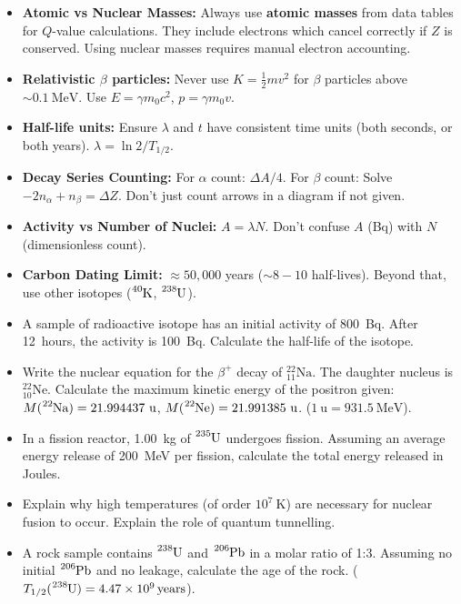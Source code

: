 \documentclass[11pt]{article}
\begin{document}
\begin{attention}
\begin{itemize}
\item \textbf{Atomic vs Nuclear Masses:} Always use \textbf{atomic masses} from data tables for $Q$-value calculations. They include electrons which cancel correctly if $Z$ is conserved. Using nuclear masses requires manual electron accounting.
\item \textbf{Relativistic $\beta$ particles:} Never use $K = \frac{1}{2}mv^2$ for $\beta$ particles above $\sim 0.1\ \text{MeV}$. Use $E = \gamma m_0 c^2$, $p = \gamma m_0 v$.
\item \textbf{Half-life units:} Ensure $\lambda$ and $t$ have consistent time units (both seconds, or both years). $\lambda = \ln 2 / T_{1/2}$.
\item \textbf{Decay Series Counting:} For $\alpha$ count: $\Delta A / 4$. For $\beta$ count: Solve $-2n_\alpha + n_\beta = \Delta Z$. Don't just count arrows in a diagram if not given.
\item \textbf{Activity vs Number of Nuclei:} $A = \lambda N$. Don't confuse $A$ (Bq) with $N$ (dimensionless count).
\item \textbf{Carbon Dating Limit:} $\approx 50,000$ years ($\sim 8-10$ half-lives). Beyond that, use other isotopes ($\ce{^{40}K}$, $\ce{^{238}U}$).
\end{itemize}
\end{attention}

\begin{exercice}
\begin{itemize}
\item A sample of radioactive isotope has an initial activity of \SI{800}{Bq}. After \SI{12}{hours}, the activity is \SI{100}{Bq}. Calculate the half-life of the isotope.
\item Write the nuclear equation for the $\beta^+$ decay of $\ensuremath{\mathrm{^{22}_{11}Na}}$. The daughter nucleus is $\ensuremath{\mathrm{^{22}_{10}Ne}}$. Calculate the maximum kinetic energy of the positron given: $M(\ce{^{22}Na}) = 21.994437\ \text{u}$, $M(\ce{^{22}Ne}) = 21.991385\ \text{u}$. ($1\ \text{u} = 931.5\ \text{MeV}$).
\item In a fission reactor, \SI{1.00}{kg} of $\ce{^{235}U}$ undergoes fission. Assuming an average energy release of \SI{200}{MeV} per fission, calculate the total energy released in Joules.
\item Explain why high temperatures (of order $10^7\ \text{K}$) are necessary for nuclear fusion to occur. Explain the role of quantum tunnelling.
\item A rock sample contains $\ce{^{238}U}$ and $\ce{^{206}Pb}$ in a molar ratio of 1:3. Assuming no initial $\ce{^{206}Pb}$ and no leakage, calculate the age of the rock. ($T_{1/2}(\ce{^{238}U}) = \SI{4.47e9}{years}$).
\end{itemize}
\end{exercice}
\end{document}
